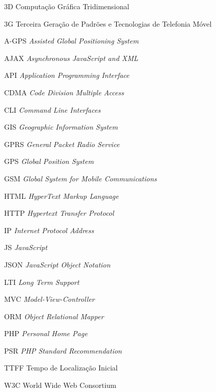
\begin{siglas}
    \item[3D] Computação Gráfica Tridimensional
    \item[3G] Terceira Geração de Padrões e Tecnologias de Telefonia Móvel
    \item[A-GPS] \textit{Assisted Global Positioning System}
    \item[AJAX] \textit{Asynchronous JavaScript and XML}
    \item[API] \textit{Application Programming Interface}
    \item[CDMA] \textit{Code Division Multiple Access}
    \item[CLI] \textit{Command Line Interfaces}
    \item[GIS] \textit{Geographic Information System}
    \item[GPRS] \textit{General Packet Radio Service}
    \item[GPS] \textit{Global Position System}
    \item[GSM] \textit{Global System for Mobile Communications}
    \item[HTML] \textit{HyperText Markup Language}
    \item[HTTP] \textit{Hypertext Transfer Protocol}
    \item[IP] \textit{Internet Protocol Address}
    \item[JS] \textit{JavaScript}
    \item[JSON] \textit{JavaScript Object Notation}
    \item[LTI] \textit{Long Term Support}
    \item[MVC] \textit{Model-View-Controller}
    \item[ORM] \textit{Object Relational Mapper}
    \item[PHP] \textit{Personal Home Page}
    \item[PSR] \textit{PHP Standard Recommendation}
    \item[TTFF] Tempo de Localização Inicial
    \item[W3C] World Wide Web Consortium
\end{siglas}


